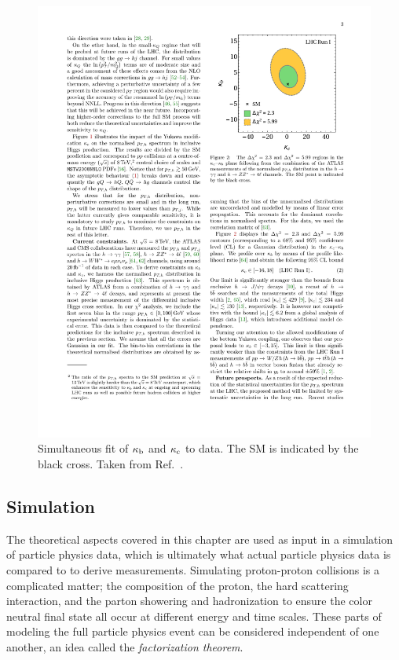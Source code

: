 \begin{figure}[hbtp]
  \begin{center}
    \includegraphics[width=0.6\linewidth]{img/theory/kbkc_constraints.pdf}
    \caption{
        Simultaneous fit of $\kappa_{\mathrm{b}}$ and $\kappa_{\mathrm{c}}$ to data.
        The SM is indicated by the black cross.
        Taken from Ref.~\cite{Bishara:2016jga}.
        }
    \label{fig:kbkc_constraints}
  \end{center}
\end{figure}



\subsection{Simulation}
\label{sec:simulation}

The theoretical aspects covered in this chapter are used as input in a simulation of particle physics data, which is ultimately what actual particle physics data is compared to to derive measurements.
% 
Simulating proton-proton collisions is a complicated matter; the composition of the proton, the hard scattering interaction, and the parton showering and hadronization to ensure the color neutral final state all occur at different energy and time scales.
% 
These parts of modeling the full particle physics event can be considered independent of one another, an idea called the \textit{factorization theorem}.



